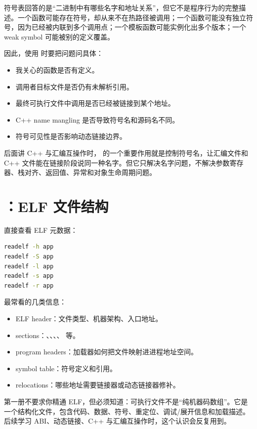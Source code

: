 符号表回答的是“二进制中有哪些名字和地址关系”，但它不是程序行为的完整描述。一个函数可能存在符号，却从来不在热路径被调用；一个函数可能没有独立符号，因为已经被内联到多个调用点；一个模板函数可能实例化出多个版本；一个 weak symbol 可能被别的定义覆盖。

因此，使用  时要把问题问具体：

\begin{itemize}
  \item 我关心的函数是否有定义。
  \item 调用者目标文件是否仍有未解析引用。
  \item 最终可执行文件中调用是否已经被链接到某个地址。
  \item C++ name mangling 是否导致符号名和源码名不同。
  \item 符号可见性是否影响动态链接边界。
\end{itemize}

后面讲 C++ 与汇编互操作时， 的一个重要作用就是控制符号名，让汇编文件和 C++ 文件能在链接阶段说同一种名字。但它只解决名字问题，不解决参数寄存器、栈对齐、返回值、异常和对象生命周期问题。

\section{：ELF 文件结构}

 直接查看 ELF 元数据：

\begin{lstlisting}[language=bash]
readelf -h app
readelf -S app
readelf -l app
readelf -s app
readelf -r app
\end{lstlisting}

最常看的几类信息：

\begin{itemize}
  \item ELF header：文件类型、机器架构、入口地址。
  \item sections：、、、、 等。
  \item program headers：加载器如何把文件映射进进程地址空间。
  \item symbol table：符号定义和引用。
  \item relocations：哪些地址需要链接器或动态链接器修补。
\end{itemize}

第一册不要求你精通 ELF，但必须知道：可执行文件不是“纯机器码数组”。它是一个结构化文件，包含代码、数据、符号、重定位、调试/展开信息和加载描述。后续学习 ABI、动态链接、C++ 与汇编互操作时，这个认识会反复用到。

